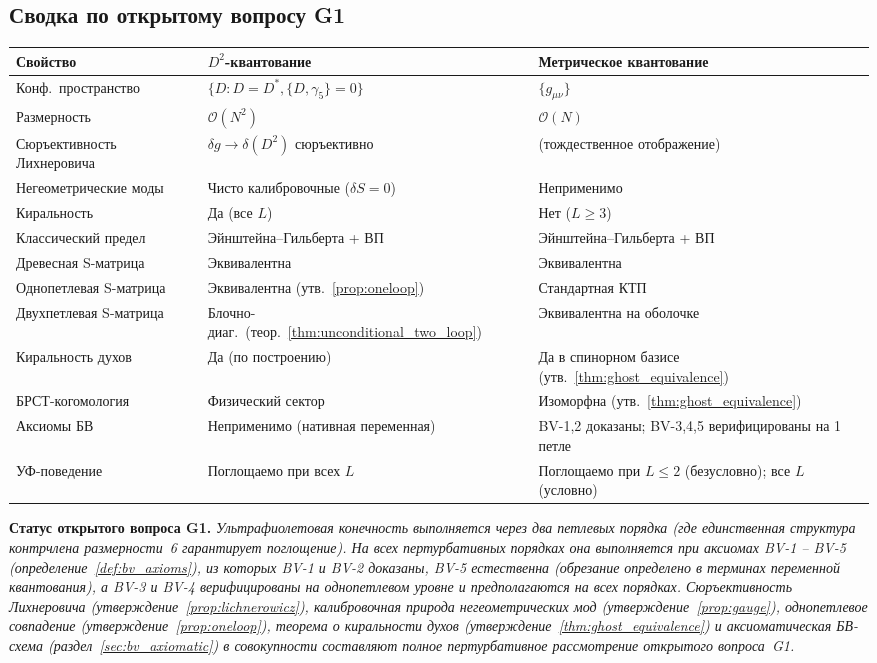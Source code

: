 \documentclass[12pt,a4paper]{article}
\theoremstyle{definition}
\theoremstyle{remark}
\newcommand{\order}{\mathcal{O}}
\begin{document}
\subsection{Сводка по открытому вопросу G1}

\begin{center}
\small
\begin{tabular}{@{}lll@{}}
\toprule
Свойство & $D^2$-квантование & Метрическое квантование \\
\midrule
Конф.\ пространство & $\{D : D\!=\!D^*, \{D, \gamma_5\}\!=\!0\}$
               & $\{g_{\mu\nu}\}$ \\
Размерность & $\order(N^2)$ & $\order(N)$ \\
Сюръективность Лихнеровича & $\delta g \to \delta(D^2)$ сюръективно
                          & (тождественное отображение) \\
Негеометрические моды & Чисто калибровочные ($\delta S = 0$) & Неприменимо \\
Киральность & Да (все $L$) & Нет ($L \geq 3$) \\
Классический предел & Эйнштейна--Гильберта + ВП & Эйнштейна--Гильберта + ВП \\
Древесная S-матрица & Эквивалентна & Эквивалентна \\
Однопетлевая S-матрица & Эквивалентна (утв.~\ref{prop:oneloop}) & Стандартная КТП \\
Двухпетлевая S-матрица & Блочно-диаг.\ (теор.~\ref{thm:unconditional_two_loop})
                  & Эквивалентна на оболочке \\
Киральность духов & Да (по построению) &
  Да в спинорном базисе (утв.~\ref{thm:ghost_equivalence}) \\
БРСТ-когомология & Физический сектор & Изоморфна
  (утв.~\ref{thm:ghost_equivalence}) \\
Аксиомы БВ & Неприменимо (нативная переменная)
          & BV-1,2 доказаны; BV-3,4,5 верифицированы на 1 петле \\
УФ-поведение & Поглощаемо при всех $L$
            & Поглощаемо при $L \leq 2$ (безусловно);
              все $L$ (условно) \\
\bottomrule
\end{tabular}
\end{center}

\medskip
\noindent\textbf{Статус открытого вопроса G1.}
\emph{Ультрафиолетовая конечность выполняется через два петлевых порядка
(где единственная структура контрчлена размерности~6 гарантирует
поглощение).
На всех пертурбативных порядках она выполняется при аксиомах BV-1 -- BV-5
(определение~\ref{def:bv_axioms}), из которых BV-1 и BV-2 доказаны,
BV-5 естественна (обрезание определено в терминах переменной
квантования), а BV-3 и BV-4 верифицированы на однопетлевом уровне и
предполагаются на всех порядках.
Сюръективность Лихнеровича (утверждение~\ref{prop:lichnerowicz}),
калибровочная природа негеометрических мод (утверждение~\ref{prop:gauge}),
однопетлевое совпадение (утверждение~\ref{prop:oneloop}), теорема о
киральности духов (утверждение~\ref{thm:ghost_equivalence}) и
аксиоматическая БВ-схема (раздел~\ref{sec:bv_axiomatic}) в
совокупности составляют полное пертурбативное рассмотрение открытого
вопроса~G1.}
\end{document}
